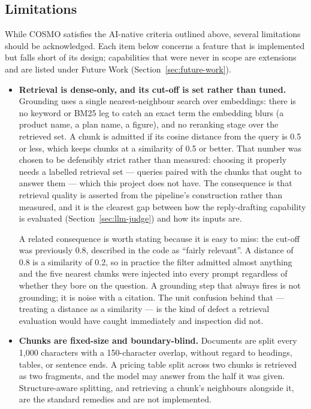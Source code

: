 \subsection{Limitations}
\label{sec:conclusion-limitations}

While COSMO satisfies the AI-native criteria outlined above,
several limitations should be acknowledged. Each item below concerns a
feature that is implemented but falls short of its design; capabilities that
were never in scope are extensions and are listed under Future Work
(Section~\ref{sec:future-work}).
\label{limit}
\begin{itemize}
  \item \textbf{Retrieval is dense-only, and its cut-off is set rather than
    tuned.} Grounding uses a single nearest-neighbour search over embeddings:
    there is no keyword or BM25 leg to catch an exact term the embedding blurs
    (a product name, a plan name, a figure), and no reranking stage over the
    retrieved set. A chunk is admitted if its cosine distance from the query is
    0.5 or less, which keeps chunks at a similarity of 0.5 or better. That
    number was chosen to be defensibly strict rather than measured: choosing it
    properly needs a labelled retrieval set --- queries paired with the chunks
    that ought to answer them --- which this project does not have. The
    consequence is that retrieval quality is asserted from the pipeline's
    construction rather than measured, and it is the clearest gap between how
    the reply-drafting capability is evaluated (Section~\ref{sec:llm-judge})
    and how its inputs are.

    A related consequence is worth stating because it is easy to miss: the
    cut-off was previously 0.8, described in the code as ``fairly relevant''.
    A distance of 0.8 is a similarity of 0.2, so in practice the filter
    admitted almost anything and the five nearest chunks were injected into
    every prompt regardless of whether they bore on the question. A grounding
    step that always fires is not grounding; it is noise with a citation. The
    unit confusion behind that --- treating a distance as a similarity --- is
    the kind of defect a retrieval evaluation would have caught immediately
    and inspection did not.

  \item \textbf{Chunks are fixed-size and boundary-blind.} Documents are split
    every 1,000 characters with a 150-character overlap, without regard to
    headings, tables, or sentence ends. A pricing table split across two chunks
    is retrieved as two fragments, and the model may answer from the half it
    was given. Structure-aware splitting, and retrieving a chunk's neighbours
    alongside it, are the standard remedies and are not implemented.


\end{itemize}
